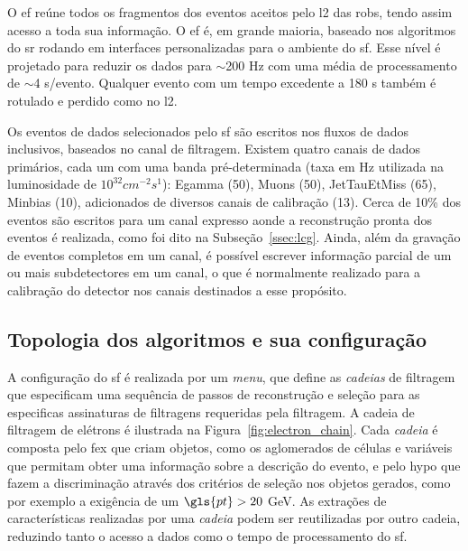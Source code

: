 O \gls{ef} reúne todos os fragmentos dos eventos aceitos pelo \gls{l2} das
\glspl{rob}, tendo assim acesso a toda sua informação. O \gls{ef} é, em grande
maioria, baseado nos algoritmos do \acrlong{sr} rodando em interfaces
personalizadas para o ambiente do \gls{sf}. Esse nível é projetado para reduzir
os dados para $\sim$200 Hz com uma média de processamento de $\sim$4 s/evento.
Qualquer evento com um tempo excedente a 180 s também é rotulado e perdido como
no \gls{l2}. 

Os eventos de dados selecionados pelo \gls{sf} são escritos nos fluxos de dados
inclusivos, baseados no canal de filtragem. Existem quatro canais de dados
primários, cada um com uma banda pré-determinada (taxa em Hz utilizada na
luminosidade de $10^{32}cm^{-2}s^{1}$): Egamma (50),
Muons (50), JetTauEtMiss (65), Minbias (10), adicionados de diversos canais
de calibração (13). Cerca de 10\% dos eventos são escritos 
para um canal expresso aonde a reconstrução pronta dos eventos é realizada, como foi dito na
Subseção~\ref{ssec:lcg}. Ainda, além da gravação de eventos completos em um
canal, é possível escrever informação parcial de um ou mais subdetectores em um
canal, o que é normalmente realizado para a calibração do detector nos canais
destinados a esse propósito.


\subsection{Topologia dos algoritmos e sua configuração}
\label{ssec:alg_topo}


A configuração do \gls{sf} é realizada por um \emph{menu}, que define as
\emph{cadeias} de filtragem que especificam uma sequência de passos de reconstrução e
seleção para as especificas assinaturas de filtragens requeridas pela filtragem.
A cadeia de filtragem de elétrons é ilustrada na Figura~\ref{fig:electron_chain}.
Cada \emph{cadeia} é composta pelo \gls{fex} que criam objetos,
como os aglomerados de células e variáveis que permitam obter uma informação
sobre a descrição do evento, e pelo \gls{hypo} que fazem a discriminação através dos
critérios de seleção nos objetos gerados, como por exemplo a exigência de um
$\gls{pt} > 20$ GeV. As extrações de características realizadas por uma
\emph{cadeia} podem ser reutilizadas por outro cadeia, reduzindo tanto o acesso
a dados como o tempo de processamento do \gls{sf}.


